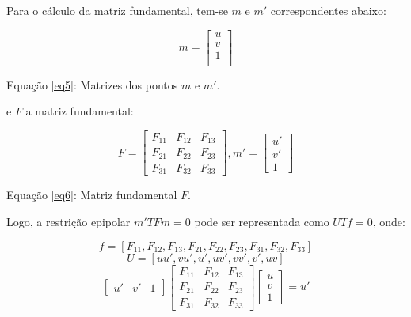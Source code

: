 Para o cálculo da matriz fundamental, tem-se $m$ e $m'$ correspondentes abaixo:

\begin{equation}\label{eq5}
m = \begin{bmatrix}u\\v\\1\\ \end{bmatrix}
\end{equation}

Equação \eqref{eq5}: Matrizes dos pontos $m$ e $m'$.

e $F$ a matriz fundamental:

\begin{equation}\label{eq6}
F = 
\begin{bmatrix}
	F_{11} &  F_{12} &  F_{13}\\
	F_{21} &  F_{22} &  F_{23}\\
	F_{31} &  F_{32} &  F_{33}
\end{bmatrix}, m' = \begin{bmatrix}u'\\v'\\1\end{bmatrix}
\end{equation}

Equação \eqref{eq6}: Matriz fundamental $F$.

Logo, a restrição epipolar $m'TFm = 0$ pode ser representada como $UTf = 0$, onde:

\begin{equation}\label{eq7}
f = [F_{11}, F_{12}, F_{13}, F_{21}, F_{22}, F_{23}, F_{31}, F_{32}, F_{33}]
\end{equation}
\begin{equation}\label{eq8}
U = [uu', vu', u', uv', vv', v', uv]
\end{equation}
\begin{equation}\label{eq9}
\begin{bmatrix}u' & v' & 1\end{bmatrix} 
\begin{bmatrix}
	F_{11} &  F_{12} &  F_{13}\\
	F_{21} &  F_{22} &  F_{23}\\
	F_{31} &  F_{32} &  F_{33}
\end{bmatrix}
\begin{bmatrix}u\\v\\1\end{bmatrix} = u'
\end{equation}

